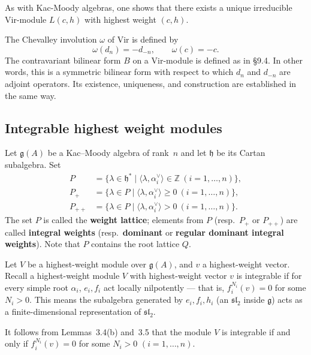 \documentclass[12pt]{article}
\begin{document}
As with Kac-Moody algebras, one shows that there exists a unique irreducible
$\mathrm{Vir}$-module $L(c,h)$ with highest weight $(c,h)$.

The Chevalley involution $\omega$ of $\mathrm{Vir}$ is defined by
\begin{equation}\label{eq:9.14.4}
    \omega(d_n) = -d_{-n}, \qquad \omega(c) = -c.
\end{equation}
The contravariant bilinear form $B$ on a $\mathrm{Vir}$-module is
defined as in \S9.4. In other words, this is a symmetric bilinear
form with respect to which $d_n$ and $d_{-n}$ are adjoint operators.
Its existence, uniqueness, and construction are established in the
same way.
\subsection{Integrable highest weight modules}
Let $\mathfrak{g}(A)$ be a Kac--Moody algebra of rank~$n$ and let
$\mathfrak{h}$ be its Cartan subalgebra. Set
\[
    \begin{aligned}
        P      & = \{\lambda \in \mathfrak{h}^* \mid \langle \lambda, \alpha_i^\vee \rangle \in \mathbb{Z}
        \ (i=1,\dots,n)\},                                                                                 \\
        P_+    & = \{\lambda \in P \mid \langle \lambda, \alpha_i^\vee \rangle \ge 0
        \ (i=1,\dots,n)\},                                                                                 \\
        P_{++} & = \{\lambda \in P \mid \langle \lambda, \alpha_i^\vee \rangle > 0
        \ (i=1,\dots,n)\}.
    \end{aligned}
\]
The set $P$ is called the \textbf{weight lattice};
elements from $P$ (resp.\ $P_+$ or $P_{++}$) are called
\textbf{integral weights} (resp.\ \textbf{dominant} or
\textbf{regular dominant integral weights}).
Note that $P$ contains the root lattice $Q$.

Let $V$ be a highest-weight module over $\mathfrak{g}(A)$,
and $v$ a highest-weight vector. Recall a highest-weight module $V$ with highest-weight vector $v$ is integrable if for every simple root $\alpha_i$, $e_i, f_i$ act locally nilpotently — that is, $f_i^{N_i}(v)=0$ for some $N_i>0$. This means the subalgebra generated by $e_i, f_i, h_i$ (an $\mathfrak{sl}_2$ inside $\mathfrak{g}$) acts as a finite-dimensional representation of $\mathfrak{sl}_2$.


It follows from Lemmas~3.4(b) and~3.5 that the module $V$ is
integrable if and only if $f_i^{N_i}(v) = 0$ for some $N_i > 0$
$(i=1,\dots,n)$.
\end{document}

